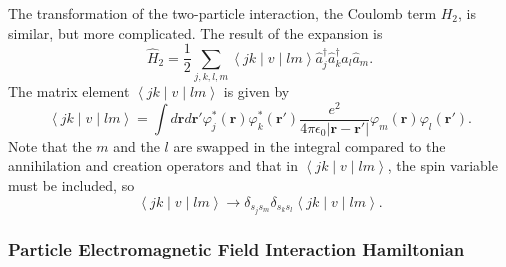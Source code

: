 The transformation of the two-particle interaction, the Coulomb term
$H_{2}$, is similar, but more complicated. The result of the expansion
is\begin{equation}
\hat{H}_{2}=\frac{1}{2}\sum_{j,k,l,m}\left\langle jk\mid v\mid lm\right\rangle \hat{a}_{j}^{\dagger}\hat{a}_{k}^{\dagger}\hat{a}_{l}\hat{a}_{m}.\label{eq:Two_Particle_Hamiltonian}\end{equation}
The matrix element $\left\langle jk\mid v\mid lm\right\rangle $ is
given by \begin{equation}
\left\langle jk\mid v\mid lm\right\rangle =\int d\mathbf{r}d\mathbf{r}'\varphi_{j}^{*}(\mathbf{r})\varphi_{k}^{*}(\mathbf{r}')\frac{e^{2}}{4\pi\epsilon_{0}\left|\mathbf{r}-\mathbf{r}'\right|}\varphi_{m}(\mathbf{r})\varphi_{l}(\mathbf{r}').\end{equation}
Note that the $m$ and the $l$ are swapped in the integral compared
to the annihilation and creation operators and that in $\left\langle jk\mid v\mid lm\right\rangle $,
the spin variable must be included, so\[
\left\langle jk\mid v\mid lm\right\rangle \rightarrow\delta_{s_{j}s_{m}}\delta_{s_{k}s_{l}}\left\langle jk\mid v\mid lm\right\rangle .\]



\subsubsection{Particle \textendash{} Electromagnetic Field Interaction Hamiltonian}

